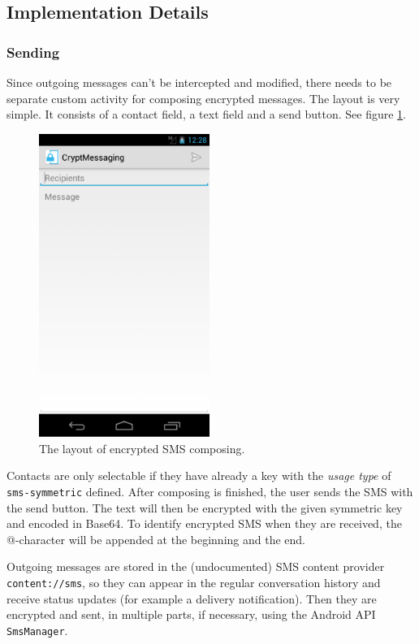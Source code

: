 \documentclass[a4paper]{scrartcl}
\begin{document}
	\subsection{Implementation Details}
		\subsubsection{Sending}
			Since outgoing messages can't be intercepted and modified, there needs to be separate custom activity for composing encrypted messages.  The layout is very simple. It consists of a contact field, a text field and a send button. See figure \ref{fig:compose}.
			\begin{figure}[h]
				\centering
					\includegraphics[width=15em]{crypt-compose.png}
				\caption{The layout of encrypted SMS composing.}
				\label{fig:compose}
			\end{figure}

			Contacts are only selectable if they have already a key with the {\em usage type} of \texttt{sms-symmetric} defined. After composing is finished, the user sends the SMS with the send button. The text will then be encrypted with the given symmetric key and encoded in Base64. To identify encrypted SMS when they are received, the @-character will be appended at the beginning and the end.

			Outgoing messages are stored in the (undocumented) SMS content provider \linebreak %
			\texttt{content://sms}, so they can appear in the regular conversation history and receive status updates (for example a delivery notification). Then they are encrypted and sent, in multiple parts, if necessary, using the Android API \texttt{SmsManager}.
\end{document}
